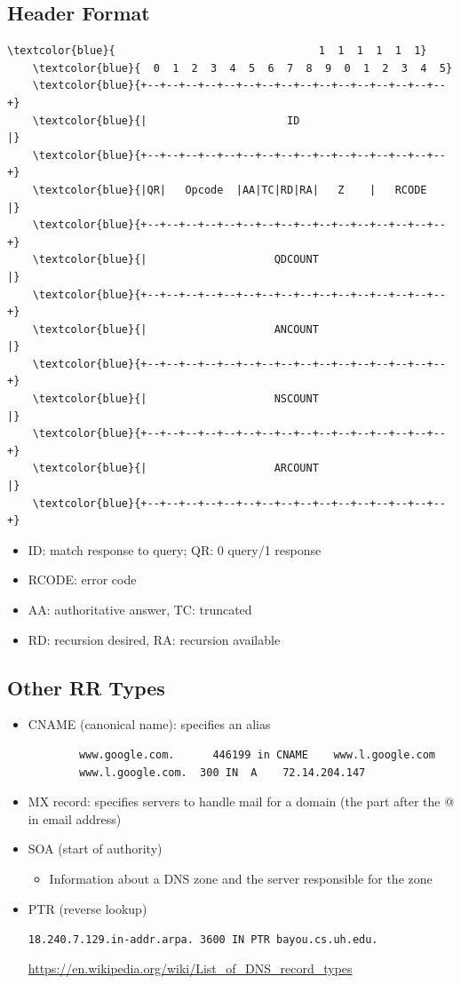\subsection{Header Format}
\begin{Verbatim}[commandchars=\\\{\}]
    \textcolor{blue}{                                1  1  1  1  1  1}
    \textcolor{blue}{  0  1  2  3  4  5  6  7  8  9  0  1  2  3  4  5}
    \textcolor{blue}{+--+--+--+--+--+--+--+--+--+--+--+--+--+--+--+--+}
    \textcolor{blue}{|                      ID                       |}
    \textcolor{blue}{+--+--+--+--+--+--+--+--+--+--+--+--+--+--+--+--+}
    \textcolor{blue}{|QR|   Opcode  |AA|TC|RD|RA|   Z    |   RCODE   |}
    \textcolor{blue}{+--+--+--+--+--+--+--+--+--+--+--+--+--+--+--+--+}
    \textcolor{blue}{|                    QDCOUNT                    |}
    \textcolor{blue}{+--+--+--+--+--+--+--+--+--+--+--+--+--+--+--+--+}
    \textcolor{blue}{|                    ANCOUNT                    |}
    \textcolor{blue}{+--+--+--+--+--+--+--+--+--+--+--+--+--+--+--+--+}
    \textcolor{blue}{|                    NSCOUNT                    |}
    \textcolor{blue}{+--+--+--+--+--+--+--+--+--+--+--+--+--+--+--+--+}
    \textcolor{blue}{|                    ARCOUNT                    |}
    \textcolor{blue}{+--+--+--+--+--+--+--+--+--+--+--+--+--+--+--+--+}
\end{Verbatim}
\begin{itemize}[nosep]
    \item ID: match response to query; QR: 0 query/1 response
    \item RCODE: error code
    \item AA: authoritative answer, TC: truncated
    \item RD: recursion desired, RA: recursion available
\end{itemize}
\subsection{Other RR Types}
\begin{itemize}[nosep]
    \item CNAME (canonical name): specifies an alias
          \begin{verbatim}
        www.google.com.      446199 in CNAME    www.l.google.com
        www.l.google.com.  300 IN  A    72.14.204.147
    \end{verbatim}
    \item MX record: specifies servers to handle mail for a domain (the part after the @ in email address)
    \item SOA (start of authority)
          \begin{itemize}[nosep]
              \item Information about a DNS zone and the server responsible for the zone
          \end{itemize}
    \item PTR (reverse lookup)

          \verb|18.240.7.129.in-addr.arpa. 3600 IN PTR bayou.cs.uh.edu.|

          \url{https://en.wikipedia.org/wiki/List_of_DNS_record_types}
\end{itemize}

